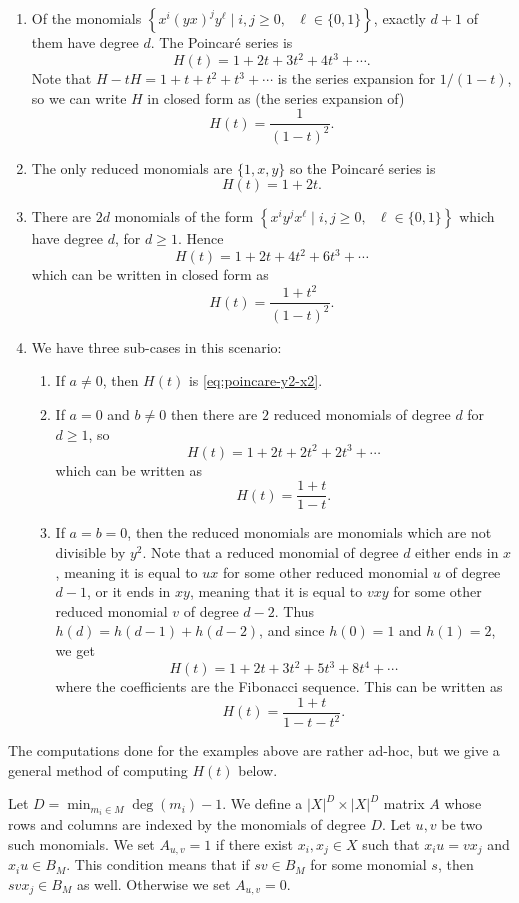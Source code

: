 \begin{enumerate}
	\item Of the monomials $\left\{x^i(yx)^jy^\ell\mid i,j\ge 0,\text{ }\ell\in\{0,1\}\right\}$, exactly $d+1$ of them have degree $d$. The Poincar\'e series is
	\begin{equation}
		H(t) = 1 + 2t + 3t^2 + 4t^3 + \cdots.\label{eq:poincare-y2-x2}
	\end{equation}
	Note that $H - tH = 1 + t + t^2 + t^3 + \cdots$ is the series expansion for $1/(1-t)$, so we can write $H$ in closed form as (the series expansion of)
	\[
		H(t) = \frac{1}{(1-t)^2}.
	\]
	\item The only reduced monomials are $\{1,x,y\}$ so the Poincar\'e series is
	\[
		H(t) = 1 + 2t.
	\]
	\setcounter{enumi}{3}
	\item There are $2d$ monomials of the form $\left\{x^iy^jx^\ell\mid i,j\ge 0,\text{ }\ell\in\{0,1\}\right\}$ which have degree $d$, for $d \geq 1$. Hence
	\[
		H(t) = 1 + 2t + 4t^2 + 6t^3 + \cdots
	\]
	which can be written in closed form as
	\[
		H(t) = \frac{1+t^2}{(1-t)^2}.
	\]
	\item We have three sub-cases in this scenario:
	\begin{enumerate}
		\item If $a\neq 0$, then $H(t)$ is \eqref{eq:poincare-y2-x2}.
		\item If $a = 0$ and $b\neq 0$ then there are $2$ reduced monomials of degree $d$ for $d \geq 1$, so
		\[
			H(t) = 1 + 2t + 2t^2 + 2t^3 + \cdots
		\]
		which can be written as
		\[
			H(t) = \frac{1+t}{1-t}.
		\]
		\item If $a = b = 0$, then the reduced monomials are monomials which are not divisible by $y^2$. Note that a reduced monomial of degree $d$ either ends in $x$, meaning it is equal to $ux$ for some other reduced monomial $u$ of degree $d-1$, or it ends in $xy$, meaning that it is equal to $vxy$ for some other reduced monomial $v$ of degree $d-2$. Thus $h(d) = h(d-1) + h(d-2)$, and since $h(0) = 1$ and $h(1) = 2$, we get
		\[
			H(t) = 1 + 2t + 3t^2 + 5t^3 + 8t^4 + \cdots
		\] 
		where the coefficients are the Fibonacci sequence. This can be written as
		\[
			H(t) = \frac{1 + t}{1 - t - t^2}.
		\]
	\end{enumerate}
\end{enumerate}
The computations done for the examples above are rather ad-hoc, but we give a general method of computing $H(t)$ below.

Let $D = \min_{m_i \in M} \deg(m_i) - 1$. We define a $|X|^D \times |X|^D$ matrix $A$ whose rows and columns are indexed by the monomials of degree $D$. Let $u,v$ be two such monomials. We set $A_{u,v} = 1$ if there exist $x_i, x_j \in X$ such that $x_i u = v x_j$ and $x_i u \in B_M$. This condition means that if $sv \in B_M$ for some monomial $s$, then $svx_j \in B_M$ as well. Otherwise we set $A_{u,v} = 0$.

